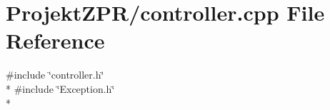 \section{Projekt\-Z\-P\-R/controller.cpp File Reference}
\label{controller_8cpp}
{\ttfamily \#include \char`\"{}controller.\-h\char`\"{}}\\*
{\ttfamily \#include \char`\"{}Exception.\-h\char`\"{}}\\*
